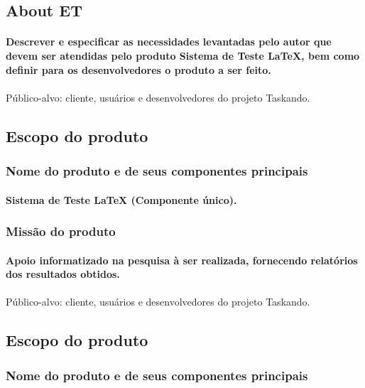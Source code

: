 \documentclass{article}
\begin{document}
	\subsection{About ET}
		\paragraph{Descrever e especificar as necessidades levantadas pelo autor que devem ser atendidas pelo produto Sistema de Teste LaTeX, bem como definir para os desenvolvedores o produto a ser feito.}

\paragraph{}Público-alvo: cliente, usuários e desenvolvedores do projeto Taskando.
	\subsection{Escopo do produto}
		\subsubsection{Nome do produto e de seus componentes principais}
			\paragraph{Sistema de Teste LaTeX (Componente único). }
		\subsubsection{Missão do produto}
			\paragraph{Apoio informatizado na pesquisa à ser realizada, fornecendo relatórios dos resultados obtidos.}
			
\paragraph{}Público-alvo: cliente, usuários e desenvolvedores do projeto Taskando.
	\subsection{Escopo do produto}
		\subsubsection{Nome do produto e de seus componentes principais}
\end{document}
